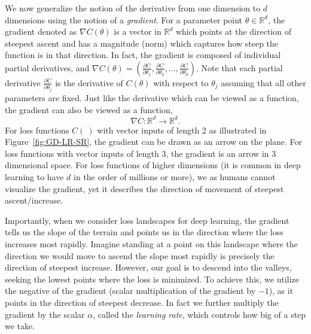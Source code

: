 We now generalize the notion of the derivative from one dimension to $d$ dimensions using the notion of a {\em gradient}. For a parameter point $\theta \in {\mathbb R}^d$, the gradient denoted as $\nabla C(\theta)$ is a vector in ${\mathbb R}^d$ which points at the direction of steepest ascent and has a magnitude (norm) which captures how steep the function is in that direction. In fact, the gradient is composed of individual partial derivatives, and $\nabla C(\theta) =  \left(\frac{\partial C}{\partial \theta_1}, \frac{\partial C}{\partial \theta_2}, ..., \frac{\partial C}{\partial \theta_d}\right)$. Note that each partial derivative $\frac{\partial C}{\partial \theta_j}$ is the derivative of $C(\theta)$ with respect to $\theta_j$ assuming that all other parameters are fixed. Just like the derivative which can be viewed as a function, the gradient can also be viewed as a function,
%
\begin{equation}
\label{eq:grad-def}
\nabla C: {\mathbb R}^d \to {\mathbb R}^d.
\end{equation}
%
For loss functions $C(~)$ with vector inputs of length 2 as illustrated in Figure~\ref{fig:GD-LR-SR}, the gradient can be drawn as an arrow on the plane. For loss functions with vector inputs of length 3, the gradient is an arrow in 3 dimensional space. For loss functions of higher dimensions (it is common in deep learning to have $d$ in the order of millions or more), we as humans cannot visualize the gradient, yet it describes the direction of movement of steepest ascent/increase. 

Importantly, when we consider loss landscapes for deep learning, the gradient tells us the slope of the terrain and points us in the direction where the loss increases most rapidly. Imagine standing at a point on this landscape where the direction we would move to ascend the slope most rapidly is precisely the direction of steepest increase. However, our goal is to descend into the valleys, seeking the lowest points where the loss is minimized. To achieve this, we utilize the negative of the gradient (scalar multiplication of the gradient by $-1$), as it points in the direction of steepest decrease. In fact we further multiply the gradient by the scalar $\alpha$, called the {\em learning rate}, which controls how big of a step we take.

